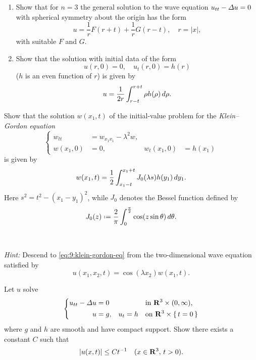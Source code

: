 \begin{problem}
  \begin{enumerate}[label=(\alph*),noitemsep]
  \item Show that for \(n=3\) the general solution to the wave equation
    \(u_{tt}-\Lap u=0\) with spherical symmetry about the origin has the
    form
    \[
      u=\frac{1}{r}F(r+t)+\frac{1}{r}G(r-t),\quad r=|x|,
    \]
    with suitable \(F\) and \(G\).
  \item Show that the solution with initial data of the form
    \[
      u(r,0)=0,\quad u_t(r,0)=h(r)
    \]
    (\(h\) is an even function of \(r\)) is given by
    \[
      u=\frac{1}{2r}\int_{r-t}^{r+t} \rho h(\rho)\mathop{}\!d \rho.
    \]
  \end{enumerate}
\end{problem}
\begin{solution*}
\end{solution*}

\begin{problem}
  Show that the solution \(w(x_1,t)\) of the initial-value problem for the
  \emph{Klein--Gordon equation}
  \begin{equation}
    \label{eq:9:klein-gordon-eq}
    \left\{
      \begin{aligned}
        w_{tt}&=w_{x_1x_1}-\lambda^2w,\\
        w(x_1,0)&=0,&w_t(x_1,0)&=h(x_1)
      \end{aligned}
    \right.
  \end{equation}
  is given by
  \[
    w(x_1,t)=\frac{1}{2}\int_{x_1-t}^{x_1+t}J_0(\lambda s) h(y_1)\mathop{}\!d y_1.
  \]
  Here \(s^2=t^2-(x_1-y_1)^2\), while \(J_0\) denotes the Bessel function
  defined by
  \[
    J_0(z)\defeq \frac{2}{\pi}\int_0^{\frac{\pi}{2}}\cos(z\sin\theta)\diff\theta.
  \]
  \\\\
  \emph{Hint:} Descend to \eqref{eq:9:klein-gordon-eq} from the
  two-dimensional wave equation satisfied by
  \[
    u(x_1,x_2,t)=\cos(\lambda x_2)w(x_1,t).
  \]
\end{problem}
\begin{solution*}
\end{solution*}

\begin{problem}
  Let \(u\) solve
  \[
    \left\{
      \begin{aligned}
        u_{tt}-\Lap u&=0&&&&\text{in \(\R^3\times(0,\infty)\),}\\
        u&=g,&u_t&=h&&\text{on \(\R^3\times\{\,t=0\,\}\)}
      \end{aligned}
    \right.
  \]
  where \(g\) and \(h\) are smooth and have compact support. Show there
  exists a constant \(C\) such that
  \[
    |u(x,t)|\leq Ct^{-1}\quad(x\in\mathbf{R}^3,\,t>0).
  \]
\end{problem}
\begin{solution*}
\end{solution*}

